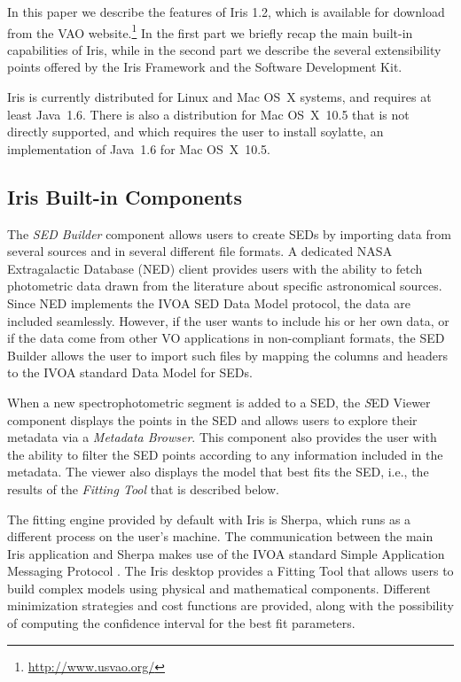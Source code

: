 In this paper we describe the features of Iris 1.2, which is available for download from the VAO website.\footnote{\url{http://www.usvao.org/}} In the first part we briefly recap the main built-in capabilities of Iris, while in the second part we describe the several extensibility points offered by the Iris Framework and the Software Development Kit.

Iris is currently distributed for Linux and Mac OS~X systems, and requires at least Java~1.6. There is also a distribution for Mac OS~X~10.5 that is not directly supported, and which requires the user to install soylatte, an implementation of Java~1.6 for Mac OS~X~10.5.

\subsection{Iris Built-in Components}
The \emph{SED Builder} component allows users to create SEDs by importing data from several sources and in several different file formats. A dedicated NASA Extragalactic Database (NED) client provides users with the ability to fetch photometric data drawn from the literature about specific astronomical sources. Since NED implements the IVOA SED Data Model protocol, the data are included seamlessly. However, if the user wants to include his or her own data, or if the data come from other VO applications in non-compliant formats, the SED Builder allows the user to import such files by mapping the columns and headers to the IVOA standard Data Model for SEDs.

When a new spectrophotometric segment is added to a SED, the {\emph SED Viewer} component displays the points in the SED and allows users to explore their metadata via a \emph{Metadata Browser}.  This component also provides the user with the ability to filter the SED points according to any information included in the metadata. The viewer also displays the model that best fits the SED, i.e., the results of the \emph{Fitting Tool} that is described below.

The fitting engine provided by default with Iris is Sherpa, which runs as a different process on the user's machine. The communication between the main Iris application and Sherpa makes use of the IVOA standard Simple Application Messaging Protocol \citep[SAMP;][]{samp1.3}. The Iris desktop provides a Fitting Tool that allows users to build complex models using physical and mathematical components. Different minimization strategies and cost functions are provided, along with the possibility of computing the confidence interval for the best fit parameters.

